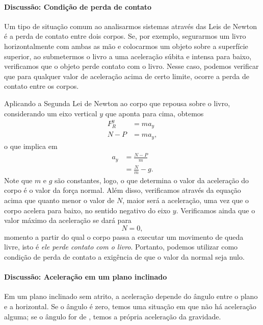 \paragraph{Discussão: Condição de perda de contato}
\label{Sec:CondicaoPerdaContato}

Um tipo de situação comum ao analisarmos sistemas através das Leis de Newton é a perda de contato entre dois corpos. Se, por exemplo, segurarmos um livro horizontalmente com ambas as mão e colocarmos um objeto sobre a superfície superior, ao submetermos o livro a uma aceleração súbita e intensa para baixo, verificamos que o objeto perde contato com o livro. Nesse caso, podemos verificar que para qualquer valor de aceleração acima de certo limite, ocorre a perda de contato entre os corpos.

Aplicando a Segunda Lei de Newton ao corpo que repousa sobre o livro, considerando um eixo vertical $y$ que aponta para cima, obtemos
\begin{align}
    F_R^y &= m a_y \\
    N - P &= m a_y,
\end{align}
%
o que implica em
\begin{align}
    a_y &= \frac{N - P}{m} \\
    &= \frac{N}{m} - g.
\end{align}
%
Note que $m$ e $g$ são constantes, logo, o que determina o valor da aceleração do corpo é o valor da força normal. Além disso, verificamos através da equação acima que quanto menor o valor de $N$, maior será a aceleração, uma vez que o corpo acelera para baixo, no sentido negativo do eixo $y$. Verificamos ainda que o valor máximo da aceleração se dará para 
\begin{equation}
    N = 0,
\end{equation}
%
momento a partir do qual o corpo passa a executar um movimento de queda livre, isto é \emph{ele perde contato com o livro}. Portanto, podemos utilizar como condição de perda de contato a exigência de que o valor da normal seja nulo.

\paragraph{Discussão: Aceleração em um plano inclinado}

Em um plano inclinado sem atrito, a aceleração depende do ângulo entre o plano e a horizontal. Se o ângulo é zero, temos uma situação em que não há aceleração alguma; se o ângulo for de , temos a própria aceleração da gravidade.

